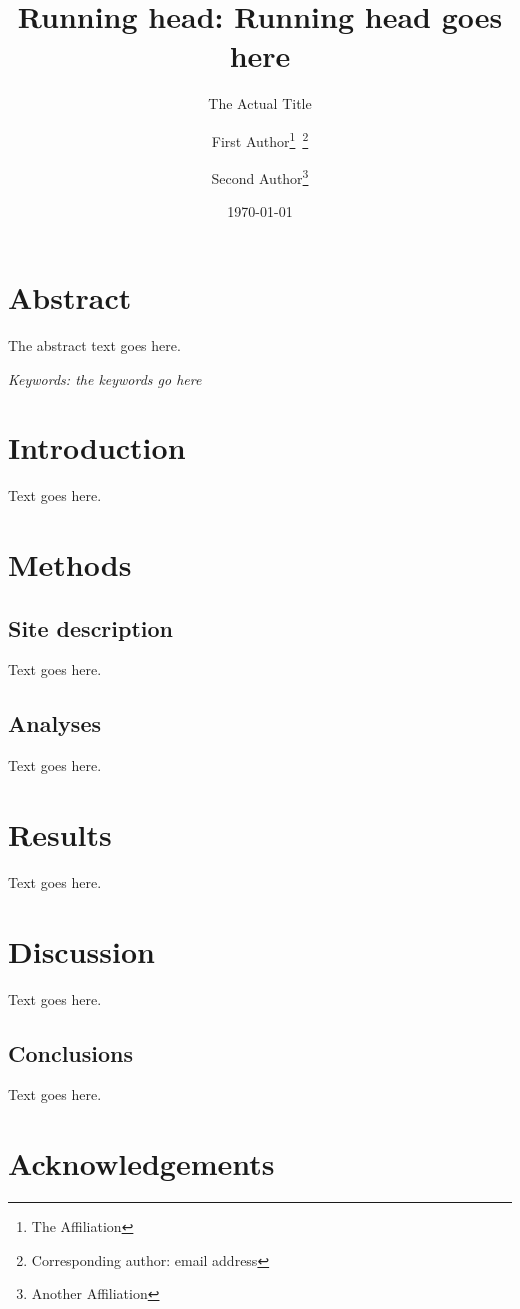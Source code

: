 \documentclass[11pt, letterpaper]{scrartcl}
\title{\small Running head: Running head goes here}
\subtitle{The Actual Title}
\author{
	First Author\thanks{The Affiliation}\, \thanks{Corresponding author: email address} 
	\and
	Second Author\footnotemark[2]\thanks{Another Affiliation}
}
\date{\today}
\begin{document}
\maketitle\newpage

\section*{Abstract}
The abstract text goes here.

\emph{Keywords: the keywords go here}

\newpage

\section*{Introduction}

Text goes here.

\section*{Methods}
\subsection*{Site description}

Text goes here.

\subsection*{Analyses}

Text goes here.

\section*{Results}

Text goes here.

\section*{Discussion}

Text goes here.

\subsection*{Conclusions}

Text goes here.

\section*{Acknowledgements}
\end{document}
